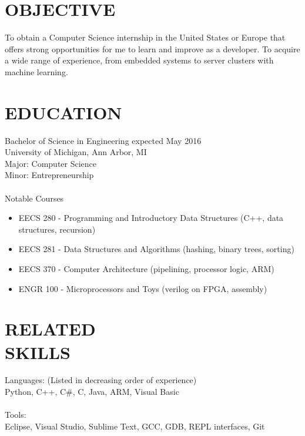\documentclass[line,margin]{res}
\begin{document}
\address{ajlj@umich.edu -- 248-622-7017}
\address{Citizen of the United States and Italy}
 
 \renewcommand{\labelitemi}{$-$}
 
\begin{resume}
\section{OBJECTIVE}
				To obtain a Computer Science internship in the United States or Europe that offers strong opportunities for me to learn and improve as a developer. To acquire a wide range of experience, from embedded systems to server clusters with machine learning.

\section{EDUCATION} {\sc Bachelor of Science in Engineering} \hfill expected May 2016\\
				University of Michigan, Ann Arbor, MI \\
                Major: Computer Science \\
                Minor: Entrepreneurship \\ \\
                {\sc Notable Courses}
                \begin{itemize} \itemsep0em
                \item EECS 280 - Programming and Introductory Data Structures (C++, data structures, recursion)
                \item EECS 281 - Data Structures and Algorithms (hashing, binary trees, sorting)
                \item EECS 370 - Computer Architecture (pipelining, processor logic, ARM)
                \item ENGR 100 - Microprocessors and Toys (verilog on FPGA, assembly) 
                \end{itemize}
 
 
\section{RELATED \\ SKILLS} 
				{\sc Languages: (Listed in decreasing order of experience)} \\
				Python, C++, C\#, C, Java, ARM, Visual Basic \\ \\
                {\sc Tools:} \\
                Eclipse, Visual Studio, Sublime Text, GCC, GDB, REPL interfaces, Git
 

\end{resume}
\end{document}
